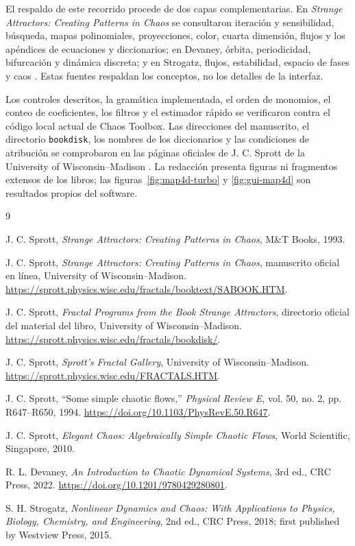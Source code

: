 \documentclass[11pt]{article}
\newcommand{\codigo}[1]{\texttt{#1}}
\begin{document}
El respaldo de este recorrido procede de dos capas complementarias. En
\emph{Strange Attractors: Creating Patterns in Chaos} se consultaron iteración y
sensibilidad, búsqueda, mapas polinomiales, proyecciones, color, cuarta dimensión,
flujos y los apéndices de ecuaciones y diccionarios; en Devaney, órbita, periodicidad,
bifurcación y dinámica discreta; y en Strogatz, flujos, estabilidad, espacio de fases y
caos \cite{sprott1993,devaney2022,strogatz2018}. Estas fuentes respaldan los conceptos,
no los detalles de la interfaz.

Los controles descritos, la gramática implementada, el orden de monomios, el
conteo de coeficientes, los filtros y el estimador rápido se verificaron contra el código
local actual de Chaos Toolbox. Las direcciones del manuscrito, el directorio
\codigo{bookdisk}, los nombres de los diccionarios y las condiciones de atribución se
comprobaron en las páginas oficiales de J. C. Sprott de la University of
Wisconsin--Madison \cite{sprottbookonline,sprottbookdisk,sprottgallery}. La redacción presenta
figuras ni fragmentos extensos de los libros; las figuras~\ref{fig:map4d-turbo} y
\ref{fig:gui-map4d} son resultados propios del software.

\begin{thebibliography}{9}

J. C. Sprott,
\emph{Strange Attractors: Creating Patterns in Chaos},
M\&T Books, 1993.

J. C. Sprott,
\emph{Strange Attractors: Creating Patterns in Chaos}, manuscrito oficial en línea,
University of Wisconsin--Madison.
\url{https://sprott.physics.wisc.edu/fractals/booktext/SABOOK.HTM}.

J. C. Sprott,
\emph{Fractal Programs from the Book Strange Attractors}, directorio oficial del
material del libro, University of Wisconsin--Madison.
\url{https://sprott.physics.wisc.edu/fractals/bookdisk/}.

J. C. Sprott,
\emph{Sprott's Fractal Gallery}, University of Wisconsin--Madison.
\url{https://sprott.physics.wisc.edu/FRACTALS.HTM}.

J. C. Sprott,
``Some simple chaotic flows,''
\emph{Physical Review E}, vol. 50, no. 2, pp. R647--R650, 1994.
\url{https://doi.org/10.1103/PhysRevE.50.R647}.

J. C. Sprott,
\emph{Elegant Chaos: Algebraically Simple Chaotic Flows},
World Scientific, Singapore, 2010.

R. L. Devaney,
\emph{An Introduction to Chaotic Dynamical Systems}, 3rd ed.,
CRC Press, 2022.
\url{https://doi.org/10.1201/9780429280801}.

S. H. Strogatz,
\emph{Nonlinear Dynamics and Chaos: With Applications to Physics, Biology,
Chemistry, and Engineering}, 2nd ed.,
CRC Press, 2018; first published by Westview Press, 2015.

\end{thebibliography}
\end{document}
